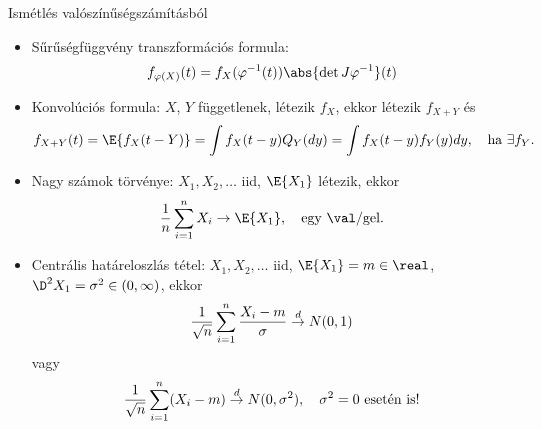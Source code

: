 \documentclass[aspectratio=169,notheorems,9pt,\option]{beamer}
\begin{document}

\begin{frame}{Ismétlés valószínűségszámításból}

  \begin{itemize}
    \item Sűrűségfüggvény transzformációs formula:
    \begin{displaymath}
      f_{\phi(X)}(t)=f_X(\phi^{-1}(t))\abs{\det J\phi^{-1}}(t)
    \end{displaymath}
    \item Konvolúciós formula: $X$, $Y$ függetlenek, létezik $f_X$, ekkor létezik $f_{X+Y}$ és 
    \begin{displaymath}
      f_{X+Y}(t)=\E{f_X(t-Y)}=\int f_X(t-y) Q_Y(dy)=\int f_X(t-y)f_Y(y)d y,\quad 
      \text{ha $\exists f_Y$}. %
    \end{displaymath}
    \item Nagy számok törvénye: $X_1,X_2,\dots$ iid, $\E{X_1}$ létezik, ekkor
    \begin{displaymath}
      \frac1n\sum_{i=1}^n X_i\to \E{X_1},\quad \text{egy \val/gel.}
    \end{displaymath}
    \item Centrális határeloszlás tétel: $X_1,X_2,\dots$ iid, 
    $\E{X_1}=m\in\real$,  $\D^2{X_1}=\sigma^2\in(0,\infty)$, 
    ekkor 
    \begin{displaymath}
      \frac1{\sqrt{n}}\sum_{i=1}^n \frac{X_i-m}{\sigma}\stackrel{d}{\to} N(0,1)
    \end{displaymath}
    vagy 
    \begin{displaymath}
      \frac1{\sqrt{n}}\sum_{i=1}^n (X_i-m)\stackrel{d}{\to} N(0,\sigma^2),\quad \text{$\sigma^2=0$ esetén is!}
    \end{displaymath}
  \end{itemize}
\end{frame}
\end{document}

